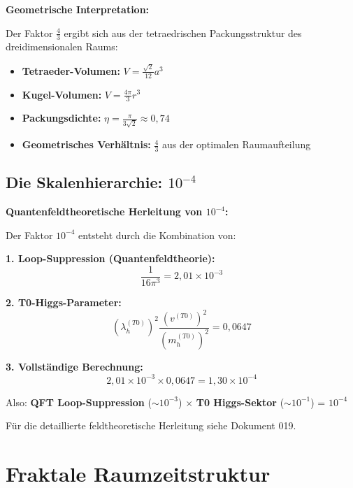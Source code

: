 	\begin{alternative}
		\textbf{Geometrische Interpretation:}
		
		Der Faktor $\frac{4}{3}$ ergibt sich aus der tetraedrischen Packungsstruktur des dreidimensionalen Raums:
		\begin{itemize}
			\item \textbf{Tetraeder-Volumen:} $V = \frac{\sqrt{2}}{12}a^3$
			\item \textbf{Kugel-Volumen:} $V = \frac{4\pi}{3}r^3$ 
			\item \textbf{Packungsdichte:} $\eta = \frac{\pi}{3\sqrt{2}} \approx 0{,}74$
			\item \textbf{Geometrisches Verhältnis:} $\frac{4}{3}$ aus der optimalen Raumaufteilung
		\end{itemize}
	\end{alternative}
	
	\subsection{Die Skalenhierarchie: $10^{-4}$}
	
	\begin{foundation}
		\textbf{Quantenfeldtheoretische Herleitung von $10^{-4}$:}
		
		Der Faktor $10^{-4}$ entsteht durch die Kombination von:
		
		\textbf{1. Loop-Suppression (Quantenfeldtheorie):}
		\begin{equation}
			\frac{1}{16\pi^3} = 2{,}01 \times 10^{-3}
		\end{equation}
		
		\textbf{2. T0-Higgs-Parameter:}
		\begin{equation}
			(\lambda_h^{(T0)})^2 \frac{(v^{(T0)})^2}{(m_h^{(T0)})^2} = 0{,}0647
		\end{equation}
		
		\textbf{3. Vollständige Berechnung:}
		\begin{equation}
			2{,}01 \times 10^{-3} \times 0{,}0647 = 1{,}30 \times 10^{-4}
		\end{equation}
		
		Also: \textbf{QFT Loop-Suppression} ($\sim 10^{-3}$) $\times$ \textbf{T0 Higgs-Sektor} ($\sim 10^{-1}$) = $10^{-4}$
		
		Für die detaillierte feldtheoretische Herleitung siehe Dokument 019.
	\end{foundation}
	
	\section{Fraktale Raumzeitstruktur}
	
